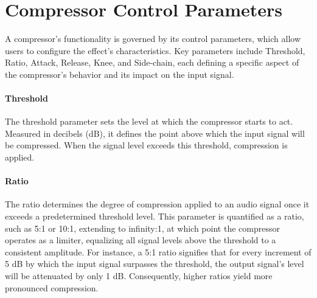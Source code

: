 \documentclass[10pt]{article}
\begin{document}
\begin{multicols*}{2}
\begin{minipage}{\linewidth}
            \label{fig:comp-ratio}
        \end{minipage}

        \section{Compressor Control Parameters}
            A compressor's functionality is governed by its control parameters, which allow users to configure the effect's characteristics. Key parameters include Threshold, Ratio, Attack, Release, Knee, and Side-chain, each defining a specific aspect of the compressor's behavior and its impact on the input signal.

            \paragraph{Threshold}
                The threshold parameter sets the level at which the compressor starts to act. Measured in decibels (dB), it defines the point above which the input signal will be compressed. When the signal level exceeds this threshold, compression is applied.

            \paragraph{Ratio}
                The ratio determines the degree of compression applied to an audio signal once it exceeds a predetermined threshold level. This parameter is quantified as a ratio, such as 5:1 or 10:1, extending to infinity:1, at which point the compressor operates as a limiter, equalizing all signal levels above the threshold to a consistent amplitude. For instance, a 5:1 ratio signifies that for every increment of 5 dB by which the input signal surpasses the threshold, the output signal's level will be attenuated by only 1 dB. Consequently, higher ratios yield more pronounced compression.


\end{multicols*}
\end{document}
